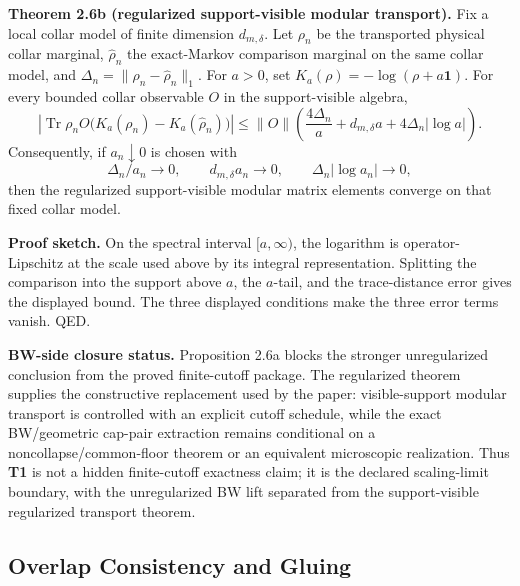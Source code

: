 \textbf{Theorem 2.6b (regularized support-visible modular transport).} Fix a local collar model of finite dimension \(d_{m,\delta}\). Let \(\rho_n\) be the transported physical collar marginal, \(\widehat\rho_n\) the exact-Markov comparison marginal on the same collar model, and \(\Delta_n=\|\rho_n-\widehat\rho_n\|_1\). For \(a>0\), set \(K_a(\rho)=-\log(\rho+a\mathbf 1)\). For every bounded collar observable \(O\) in the support-visible algebra,
\[
\left|\operatorname{Tr}\rho_n O\bigl(K_a(\rho_n)-K_a(\widehat\rho_n)\bigr)\right|
\le
\|O\|\left(
  \frac{4\Delta_n}{a}
  + d_{m,\delta}a
  +4\Delta_n|\log a|
\right).
\]
Consequently, if \(a_n\downarrow0\) is chosen with
\[
\Delta_n/a_n\to0,\qquad
d_{m,\delta}a_n\to0,\qquad
\Delta_n|\log a_n|\to0,
\]
then the regularized support-visible modular matrix elements converge on that fixed collar model.

\textbf{Proof sketch.} On the spectral interval \([a,\infty)\), the logarithm is operator-Lipschitz at the scale used above by its integral representation. Splitting the comparison into the support above \(a\), the \(a\)-tail, and the trace-distance error gives the displayed bound. The three displayed conditions make the three error terms vanish. QED.

\textbf{BW-side closure status.} Proposition 2.6a blocks the stronger unregularized conclusion from the proved finite-cutoff package. The regularized theorem supplies the constructive replacement used by the paper: visible-support modular transport is controlled with an explicit cutoff schedule, while the exact BW/geometric cap-pair extraction remains conditional on a noncollapse/common-floor theorem or an equivalent microscopic realization. Thus \textbf{T1} is not a hidden finite-cutoff exactness claim; it is the declared scaling-limit boundary, with the unregularized BW lift separated from the support-visible regularized transport theorem.
\subsection{Overlap Consistency and Gluing}\label{3-overlap-consistency-and-gluing}

